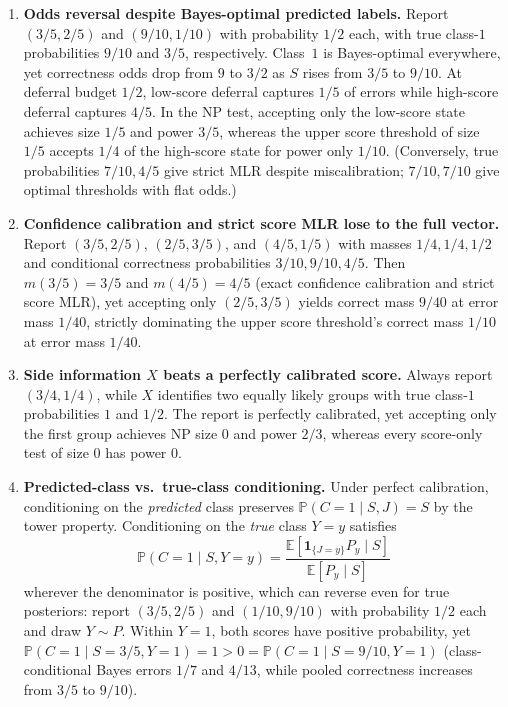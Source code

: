 \documentclass[11pt]{article}
\theoremstyle{plain}
\theoremstyle{definition}
\theoremstyle{remark}
\begin{document}
\begin{enumerate}[label=\textup{(\arabic*)},leftmargin=*]
\item \textbf{Odds reversal despite Bayes-optimal predicted labels.} Report $(3/5, 2/5)$ and $(9/10, 1/10)$ with probability $1/2$ each, with true class-$1$ probabilities $9/10$ and $3/5$, respectively. Class~$1$ is Bayes-optimal everywhere, yet correctness odds drop from $9$ to $3/2$ as $S$ rises from $3/5$ to $9/10$. At deferral budget $1/2$, low-score deferral captures $1/5$ of errors while high-score deferral captures $4/5$. In the NP test, accepting only the low-score state achieves size $1/5$ and power $3/5$, whereas the upper score threshold of size $1/5$ accepts $1/4$ of the high-score state for power only $1/10$. (Conversely, true probabilities $7/10, 4/5$ give strict MLR despite miscalibration; $7/10, 7/10$ give optimal thresholds with flat odds.)
\item \textbf{Confidence calibration and strict score MLR lose to the full vector.} Report $(3/5, 2/5)$, $(2/5, 3/5)$, and $(4/5, 1/5)$ with masses $1/4, 1/4, 1/2$ and conditional correctness probabilities $3/10, 9/10, 4/5$. Then $m(3/5) = 3/5$ and $m(4/5) = 4/5$ (exact confidence calibration and strict score MLR), yet accepting only $(2/5, 3/5)$ yields correct mass $9/40$ at error mass $1/40$, strictly dominating the upper score threshold's correct mass $1/10$ at error mass $1/40$.
\item \textbf{Side information $X$ beats a perfectly calibrated score.} Always report $(3/4, 1/4)$, while $X$ identifies two equally likely groups with true class-$1$ probabilities $1$ and $1/2$. The report is perfectly calibrated, yet accepting only the first group achieves NP size $0$ and power $2/3$, whereas every score-only test of size $0$ has power $0$.
\item \textbf{Predicted-class vs.\ true-class conditioning.} Under perfect calibration, conditioning on the \emph{predicted} class preserves $\mathbb{P}(C = 1 \mid S, J) = S$ by the tower property. Conditioning on the \emph{true} class $Y = y$ satisfies
\[
\mathbb{P}(C = 1 \mid S, Y = y) = \frac{\mathbb{E}[\mathbf{1}_{\{J = y\}} P_y \mid S]}{\mathbb{E}[P_y \mid S]}
\]
wherever the denominator is positive, which can reverse even for true posteriors: report $(3/5, 2/5)$ and $(1/10, 9/10)$ with probability $1/2$ each and draw $Y \sim P$. Within $Y = 1$, both scores have positive probability, yet $\mathbb{P}(C = 1 \mid S = 3/5, Y = 1) = 1 > 0 = \mathbb{P}(C = 1 \mid S = 9/10, Y = 1)$ (class-conditional Bayes errors $1/7$ and $4/13$, while pooled correctness increases from $3/5$ to $9/10$).
\end{enumerate}
\end{document}
